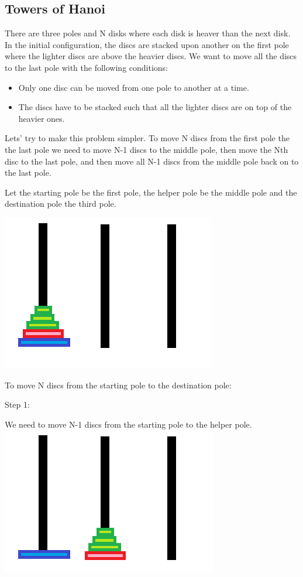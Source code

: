 \documentclass[11pt,oneside]{book}
\makeatletter
\def\maxwidth#1{\ifdim\Gin@nat@width>#1 #1\else\Gin@nat@width\fi}
\makeatother
\begin{document}
\subsection{Towers of Hanoi}

There are three poles and N disks where each disk is heaver than the next disk. In the initial configuration, the discs are stacked upon another on the first pole where the lighter discs are above the heavier discs. We want to move all the discs to the last pole with the following conditions:

\begin{itemize}
\item Only one disc can be moved from one pole to another at a time.
\item The discs have to be stacked such that all the lighter discs are on top of the heavier ones.
\end{itemize}

Lets' try to make this problem simpler. To move N discs from the first pole the the last pole we need to move N-1 discs to the middle pole, then move the Nth disc to the last pole, and then move all N-1 discs from the middle pole back on to the last pole.

Let the starting pole be the first pole, the helper pole be the middle pole and the destination pole the third pole.

\vspace{5px}\includegraphics[width=\maxwidth{\textwidth}]{hanoi.png}

To move N discs from the starting pole to the destination pole:

Step 1:

We need to move N-1 discs from the starting pole to the helper pole.
\vspace{5px}\includegraphics[width=\maxwidth{\textwidth}]{hanoi2.png}
\end{document}
